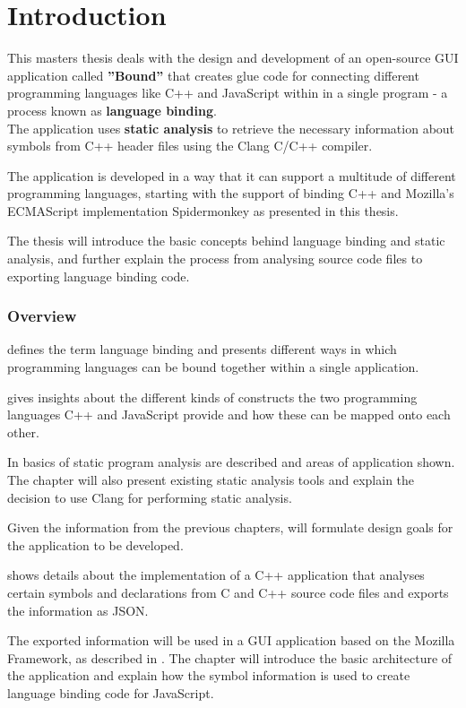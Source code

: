 \chapter{Introduction}

This masters thesis deals with the design and development of an open-source GUI application called \textbf{''Bound''} that creates glue code for connecting different programming languages like C++ and JavaScript within in a single program - a process known as \textbf{language binding}.\\
The application uses \textbf{static analysis} to retrieve the necessary information about symbols from C++ header files using the Clang C/C++ compiler.

The application is developed in a way that it can support a multitude of different programming languages, starting with the support of binding C++ and Mozilla's ECMAScript implementation Spidermonkey as presented in this thesis.

The thesis will introduce the basic concepts behind language binding and static analysis, and further explain the process from analysing source code files to exporting language binding code.

\subsection{Overview}

 defines the term language binding and presents different ways in which programming languages can be bound together within a single application.

 gives insights about the different kinds of constructs the two programming languages C++ and JavaScript provide and how these can be mapped onto each other.

In  basics of static program analysis are described and areas of application shown. The chapter will also present existing static analysis tools and explain the decision to use Clang for performing static analysis.

Given the information from the previous chapters,  will formulate design goals for the application to be developed.

 shows details about the implementation of a C++ application that analyses certain symbols and declarations from C and C++ source code files and exports the information as JSON.

The exported information will be used in a GUI application based on the Mozilla Framework, as described in . The chapter will introduce the basic architecture of the application and explain how the symbol information is used to create language binding code for JavaScript.




